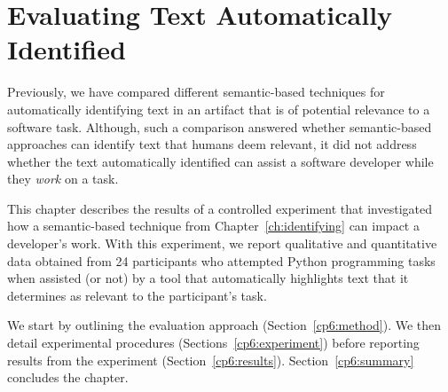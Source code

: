 \setcounter{chapter}{5}


\chapter{Evaluating Text Automatically Identified}
\label{ch:assisting}



Previously, we have compared different semantic-based techniques for automatically identifying text in an artifact that is of potential relevance to a software task.
Although, such a comparison answered whether semantic-based approaches can identify text that humans deem relevant,
it did not address whether 
the text automatically identified  
can assist a software developer while they \textit{work} on a task.



This chapter describes the results of a controlled experiment that 
investigated how a  semantic-based technique from Chapter~\ref{ch:identifying} can impact a developer's work. 
With this experiment, we report qualitative and quantitative  data obtained from 24 participants who attempted Python
programming tasks when assisted (or not) by a tool that automatically highlights text that it determines as relevant to the participant's task. 


We start by outlining the evaluation approach  (Section~\ref{cp6:method}). We then
detail experimental procedures  (Sections~\ref{cp6:experiment}) before reporting
results from the experiment 
(Section~\ref{cp6:results}).
Section~\ref{cp6:summary} concludes the chapter.


\clearpage











